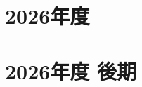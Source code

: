 \documentclass[../hsm_tok_q.tex]{subfiles}
\begin{document}
    \section{2026年度}
    
    \section{2026年度 後期}
    
\end{document}
